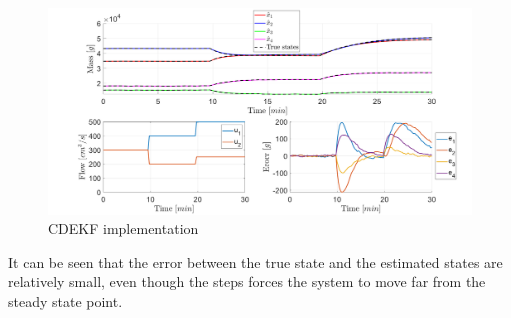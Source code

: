 \begin{figure}[H]
    \centering
    \includegraphics[width=1\textwidth]{Figures/Pr11.2_CDEKF.png}
    \caption{CDEKF implementation}
\end{figure}
It can be seen that the error between the true state and the estimated states are relatively small, even though the steps forces the system to move far from the steady state point.